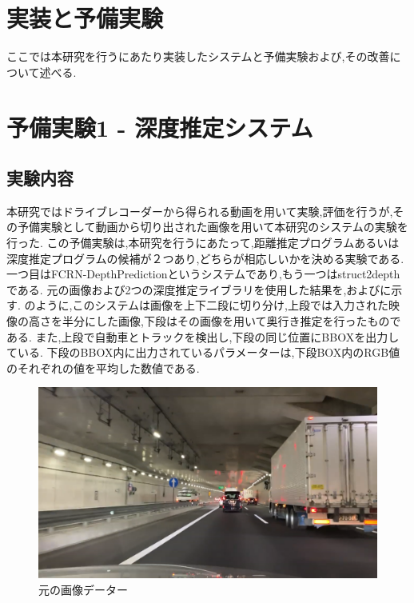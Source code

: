 \section{実装と予備実験}
ここでは本研究を行うにあたり実装したシステムと予備実験および,その改善について述べる.
\section{予備実験1 - 深度推定システム}
\subsection{実験内容}
本研究ではドライブレコーダーから得られる動画を用いて実験,評価を行うが,その予備実験として動画から切り出された画像を用いて本研究のシステムの実験を行った.
この予備実験は,本研究を行うにあたって,距離推定プログラムあるいは深度推定プログラムの候補が２つあり,どちらが相応しいかを決める実験である.
一つ目はFCRN-DepthPrediction\cite{laina2016deeper}というシステムであり,もう一つはstruct2depth\cite{casser2019struct2depth}である.
元の画像および2つの深度推定ライブラリを使用した結果を,およびに示す.
のように,このシステムは画像を上下二段に切り分け,上段では入力された映像の高さを半分にした画像,下段はその画像を用いて奥行き推定を行ったものである.
また,上段で自動車とトラックを検出し,下段の同じ位置にBBOXを出力している.
下段のBBOX内に出力されているパラメーターは,下段BOX内のRGB値のそれぞれの値を平均した数値である.
\newpage

\begin{figure}[htbp]
  \begin{center}
    \includegraphics[width=12cm]{figs/depth_raw.png}
   \end{center}
   \caption{元の画像データー}
   \label{fig:depth_raw}
  \end{figure}

